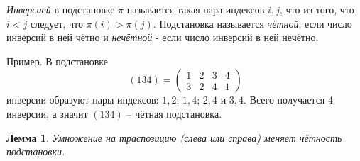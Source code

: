 \documentclass{article}
\newtheorem{lemma}{Лемма}[section]
\begin{document}
\textit{Инверсией} в подстановке $\pi$ называется такая пара индексов $i, j$, что из того, что $i < j$ следует, что $\pi(i) > \pi(j)$. Подстановка называется \textit{чётной}, если число инверсий в ней чётно и \textit{нечётной} - если число инверсий в ней нечётно.

Пример. В подстановке
\[
    (134) = 
    \begin{pmatrix}
        1 & 2 & 3 & 4 \\
        3 & 2 & 4 & 1
    \end{pmatrix}
\]
инверсии образуют пары индексов: $1, 2$; $1, 4$; $2, 4$ и $3, 4$. Всего получается 4 инверсии, а значит $(134)$ -- чётная подстановка.

\begin{lemma}
    Умножение на траспозицию (слева или справа) меняет чётность подстановки.
\end{lemma}
\end{document}
